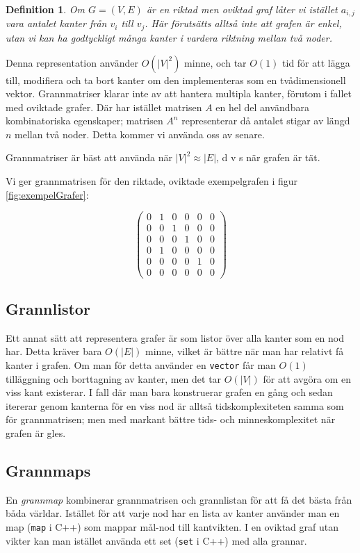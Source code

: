 \documentclass[10pt,a4paper]{article}
\newtheorem{defn}{Definition}
\theoremstyle{problem}
\begin{document}
\begin{defn}
Om $G = (V, E)$ är en riktad men oviktad graf låter vi istället $a_{i, j}$ vara antalet kanter från $v_i$ till $v_j$. Här förutsätts alltså inte
att grafen är enkel, utan vi kan ha godtyckligt många kanter i vardera riktning mellan två noder.
\end{defn}

Denna representation använder $O(|V|^2)$ minne, och tar $O(1)$ tid för att lägga till, modifiera och ta bort kanter om den implementeras
som en tvådimensionell vektor. Grannmatriser klarar inte av att hantera multipla kanter, förutom i fallet med oviktade grafer. Där har istället matrisen $A$ en
hel del användbara kombinatoriska egenskaper; matrisen $A^n$ representerar då antalet stigar av längd $n$ mellan två noder. Detta kommer vi använda oss av senare.

Grannmatriser är bäst att använda när $|V|^2 \approx |E|$, d v s när grafen är tät.

Vi ger grannmatrisen för den riktade, oviktade exempelgrafen i figur \ref{fig:exempelGrafer}:

\[ \left( \begin{array}{cccccc}
0 & 1 & 0 & 0 & 0 & 0 \\
0 & 0 & 1 & 0 & 0 & 0 \\
0 & 0 & 0 & 1 & 0 & 0 \\
0 & 1 & 0 & 0 & 0 & 0 \\
0 & 0 & 0 & 0 & 1 & 0 \\
0 & 0 & 0 & 0 & 0 & 0
\end{array} \right)\]

\subsection{Grannlistor}
Ett annat sätt att representera grafer är som listor över alla kanter som en nod har. Detta kräver bara $O(|E|)$ minne, vilket är bättre när man har
relativt få kanter i grafen. Om man för detta använder en \texttt{vector} får man $O(1)$ tilläggning och borttagning av kanter, men det tar $O(|V|)$ för att
avgöra om en viss kant existerar. I fall där man bara konstruerar grafen en gång och sedan itererar genom kanterna för en viss nod är alltså
tidskomplexiteten samma som för grannmatrisen; men med markant bättre tids- och minneskomplexitet när grafen är gles.

\subsection{Grannmaps}
En \emph{grannmap} kombinerar grannmatrisen och grannlistan för att få det bästa från båda världar. Istället för att varje nod har en lista av kanter använder
man en map (\texttt{map} i C++) som mappar mål-nod till kantvikten. I en oviktad graf utan vikter kan man istället använda ett set (\texttt{set} i C++) med alla grannar.
\end{document}
